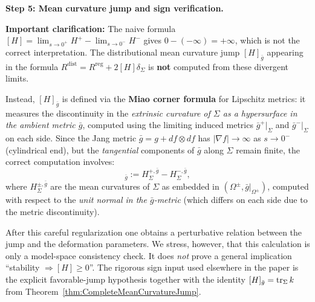\begin{example}
\textbf{Step 5: Mean curvature jump and sign verification.}

\textbf{Important clarification:} The naive formula $[H] = \lim_{s \to 0^+} H^+ - \lim_{s \to 0^-} H^-$ gives $0 - (-\infty) = +\infty$, which is not the correct interpretation. The distributional mean curvature jump $[H]_{\bar{g}}$ appearing in the formula $R^{\mathrm{dist}} = R^{\mathrm{reg}} + 2[H]\delta_\Sigma$ is \textbf{not} computed from these divergent limits.

Instead, $[H]_{\bar{g}}$ is defined via the \textbf{Miao corner formula} for Lipschitz metrics: it measures the discontinuity in the \emph{extrinsic curvature of $\Sigma$ as a hypersurface in the ambient metric $\bar{g}$}, computed using the limiting induced metrics $\bar{g}^+|_\Sigma$ and $\bar{g}^-|_\Sigma$ on each side. Since the Jang metric $\bar{g} = g + df \otimes df$ has $|\nabla f| \to \infty$ as $s \to 0^-$ (cylindrical end), but the \emph{tangential} components of $\bar{g}$ along $\Sigma$ remain finite, the correct computation involves:
\begin{equation}
    [H]_{\bar{g}} := H_{\Sigma}^{+,\bar{g}} - H_{\Sigma}^{-,\bar{g}},
\end{equation}
where $H_\Sigma^{\pm,\bar{g}}$ are the mean curvatures of $\Sigma$ as embedded in $(\Omega^\pm, \bar{g}|_{\Omega^\pm})$, computed with respect to the \emph{unit normal in the $\bar{g}$-metric} (which differs on each side due to the metric discontinuity).

After this careful regularization one obtains a perturbative relation between the jump and the deformation parameters. We stress, however, that this calculation is only a model-space consistency check. It does \emph{not} prove a general implication ``stability $\Rightarrow [H]\ge 0$''. The rigorous sign input used elsewhere in the paper is the explicit favorable-jump hypothesis together with the identity $[H]_{\bar g}=\operatorname{tr}_\Sigma k$ from Theorem~\ref{thm:CompleteMeanCurvatureJump}.
\end{example}

